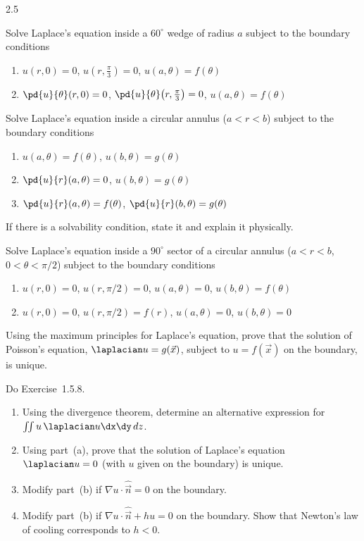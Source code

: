 \begin{exercises}{2.5}
\item Solve Laplace's equation inside a $60^\circ$ wedge of radius $a$ subject to the boundary conditions
\begin{enumerate}
\item[(a)] $u(r,0) = 0$, \quad $u\!\left(r,\frac{\pi}{3}\right) = 0$, \quad $u(a,\theta) = f(\theta)$
\item[\starred(b)] $\pd{u}{\theta}(r,0) = 0$, \quad $\pd{u}{\theta}\!\left(r,\frac{\pi}{3}\right) = 0$, \quad $u(a,\theta) = f(\theta)$
\end{enumerate}

\item Solve Laplace's equation inside a circular annulus ($a < r < b$) subject to the boundary conditions
\begin{enumerate}
\item[\starred(a)] $u(a,\theta) = f(\theta)$, \quad $u(b,\theta) = g(\theta)$
\item[(b)] $\pd{u}{r}(a,\theta) = 0$, \quad $u(b,\theta) = g(\theta)$
\item[(c)] $\pd{u}{r}(a,\theta) = f(\theta)$, \quad $\pd{u}{r}(b,\theta) = g(\theta)$
\end{enumerate}
If there is a solvability condition, state it and explain it physically.

\item\starred{} Solve Laplace's equation inside a $90^\circ$ sector of a circular annulus ($a < r < b$, $0 < \theta < \pi/2$) subject to the boundary conditions
\begin{enumerate}
\item[(a)] $u(r,0) = 0$, \quad $u(r,\pi/2) = 0$, \quad $u(a,\theta) = 0$, \quad $u(b,\theta) = f(\theta)$
\item[(b)] $u(r,0) = 0$, \quad $u(r,\pi/2) = f(r)$, \quad $u(a,\theta) = 0$, \quad $u(b,\theta) = 0$
\end{enumerate}

\item Using the maximum principles for Laplace's equation, prove that the solution of Poisson's equation, $\laplacian u = g(\vec{x})$, subject to $u = f(\vec{x})$ on the boundary, is unique.

\item Do Exercise~1.5.8.

\item
\begin{enumerate}
\item[(a)] Using the divergence theorem, determine an alternative expression for $\iint u\,\laplacian u\dx\dy\,dz$.
\item[(b)] Using part~(a), prove that the solution of Laplace's equation $\laplacian u = 0$ (with $u$ given on the boundary) is unique.
\item[(c)] Modify part~(b) if $\nabla u\cdot\hat{\vec{n}} = 0$ on the boundary.
\item[(d)] Modify part~(b) if $\nabla u\cdot\hat{\vec{n}} + hu = 0$ on the boundary. Show that Newton's law of cooling corresponds to $h < 0$.
\end{enumerate}


\end{exercises}
